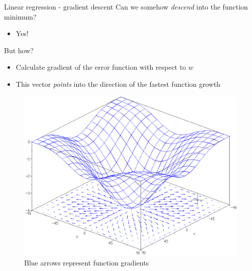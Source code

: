 \documentclass[aspectratio=169]{beamer}
\begin{document}
\begin{frame}{Linear regression - gradient descent}
    Can we somehow \textit{descend} into the function minimum?
    \begin{itemize}
        \item Yes!
    \end{itemize}
    But how?
    \begin{itemize}
        \item Calculate gradient of the error function with respect to $w$
        \item This vector \textit{points} into the direction of the fastest function growth
    \end{itemize}

    \begin{center}
        \begin{figure}
            \includegraphics[scale=0.15]{./images/gradient.png}
            \caption{Blue arrows represent function gradients}
        \end{figure}
    \end{center}
\end{frame}
\end{document}
